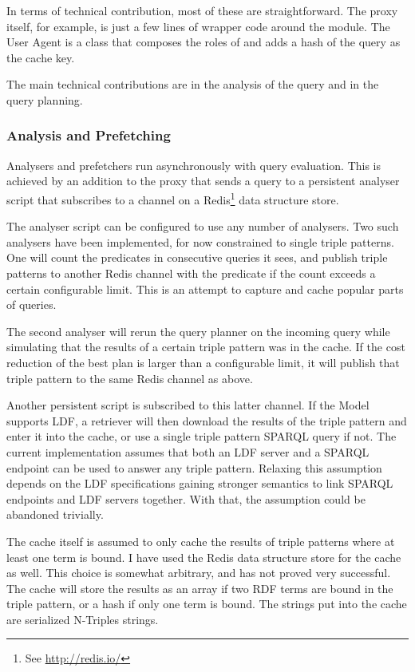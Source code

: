 In terms of technical contribution, most of these are
straightforward. The proxy itself, for example, is just a few lines of
wrapper code around the  module. The User
Agent is a class that composes the roles of
 and adds a hash of the query as
the cache key.

The main technical contributions are in the analysis of the query and
in the query planning.

\subsubsection{Analysis and Prefetching}\label{sec:analpre}

Analysers and prefetchers run asynchronously with query
evaluation. This is achieved by an addition to the proxy that sends a
query to a persistent analyser script that subscribes to a channel on
a Redis\footnote{See \url{http://redis.io/}} data structure store. 

The analyser script can be configured to use any number of analysers.
Two such analysers have been implemented, for now constrained to
single triple patterns. One will count the predicates in consecutive
queries it sees, and publish triple patterns to another Redis channel
with the predicate if the count exceeds a certain configurable
limit. This is an attempt to capture and cache popular parts of
queries.

The second analyser will rerun the query planner on the incoming query
while simulating that the results of a certain triple pattern was in
the cache. If the cost reduction of the best plan is larger than a
configurable limit, it will publish that triple pattern to the same
Redis channel as above. 

Another persistent script is subscribed to this latter channel. If the
Model supports LDF, a retriever will then download
the results of the triple pattern and enter it into the cache, or use
a single triple pattern SPARQL query if not. The current
implementation assumes that both an LDF server and a SPARQL endpoint
can be used to answer any triple pattern. Relaxing this assumption
depends on the LDF specifications gaining stronger semantics to link
SPARQL endpoints and LDF servers together. With that, the assumption
could be abandoned trivially.

The cache itself is assumed to only cache the results of triple
patterns where at least one term is bound. 
I have used the Redis data structure store for the
cache as well. This choice is somewhat arbitrary, and has not proved
very successful. The cache will store the results as an array if two
RDF terms are bound in the triple pattern, or a hash if only one term
is bound. The strings put into the cache are serialized N-Triples
strings.

